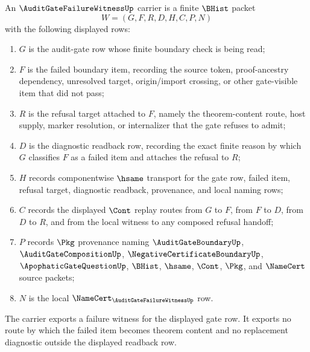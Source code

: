 \begin{definition}
\label{def:audit-gate-failure-witness-carrier}
An $\AuditGateFailureWitnessUp$ carrier is a finite $\BHist$ packet
$$
W=(G,F,R,D,H,C,P,N)
$$
with the following displayed rows:
\begin{enumerate}
\item $G$ is the audit-gate row whose finite boundary check is being read;
\item $F$ is the failed boundary item, recording the source token, proof-ancestry dependency, unresolved target, origin/import crossing, or other gate-visible item that did not pass;
\item $R$ is the refusal target attached to $F$, namely the theorem-content route, host supply, marker resolution, or internalizer that the gate refuses to admit;
\item $D$ is the diagnostic readback row, recording the exact finite reason by which $G$ classifies $F$ as a failed item and attaches the refusal to $R$;
\item $H$ records componentwise $\hsame$ transport for the gate row, failed item, refusal target, diagnostic readback, provenance, and local naming rows;
\item $C$ records the displayed $\Cont$ replay routes from $G$ to $F$, from $F$ to $D$, from $D$ to $R$, and from the local witness to any composed refusal handoff;
\item $P$ records $\Pkg$ provenance naming $\AuditGateBoundaryUp$, $\AuditGateCompositionUp$, $\NegativeCertificateBoundaryUp$, $\ApophaticGateQuestionUp$, $\BHist$, $\hsame$, $\Cont$, $\Pkg$, and $\NameCert$ source packets;
\item $N$ is the local $\NameCert_{\AuditGateFailureWitnessUp}$ row.
\end{enumerate}
The carrier exports a failure witness for the displayed gate row. It exports no route by which the failed item becomes theorem content and no replacement diagnostic outside the displayed readback row.
\end{definition}

